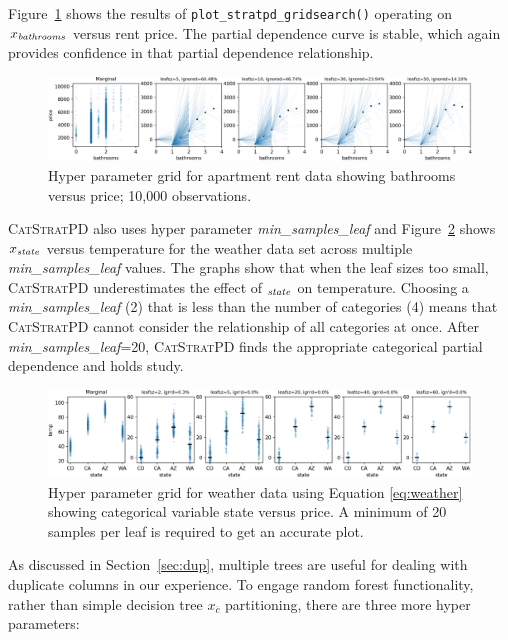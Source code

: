 \documentclass[12pt]{article}
\newcommand{\secref}[1]{Section~\ref{#1}}
\newcommand{\figref}[1]{Figure~\ref{#1}}
\newcommand{\cspd}{\fontfamily{cmr}\textsc{\small CatStratPD}}
\newcommand{\xnc}{$x_{\overline{c}}$}
\begin{document}
\figref{fig:bath_grid} shows the results of {\tt plot\_stratpd\_gridsearch()} operating on $x_{\it bathrooms}$ versus rent price. The partial dependence curve is stable, which again provides confidence in that partial dependence relationship.

\begin{figure}[htbp]
\begin{center}
\includegraphics[scale=0.5]{images/bathrooms_meta.png}
\caption{Hyper parameter grid for apartment rent data showing bathrooms versus price; 10,000 observations.}
\label{fig:bath_grid}
\end{center}
\end{figure}

\cspd{} also uses hyper parameter {\it min\_samples\_leaf} and \figref{fig:weather_grid} shows $x_{\it state}$ versus temperature for the weather data set across multiple {\it min\_samples\_leaf} values.  The graphs show that when the leaf sizes too small, \cspd{} underestimates the effect of $_{\it state}$ on temperature. Choosing a {\it min\_samples\_leaf} (2) that is less than the number of categories (4) means that \cspd{} cannot consider the relationship of all categories at once. After {\it min\_samples\_leaf}=20, \cspd{} finds the appropriate categorical partial dependence and holds study.

\begin{figure}[htbp]
\begin{center}
\includegraphics[scale=0.55]{images/state_temp_meta.png}
\caption{Hyper parameter grid for weather data using Equation \eqref{eq:weather} showing categorical variable state versus price.  A minimum of 20 samples per leaf is required to get an accurate plot.}
\label{fig:weather_grid}
\end{center}
\end{figure}


As discussed in \secref{sec:dup}, multiple trees are useful for dealing with duplicate columns in our experience. To engage random forest functionality, rather than simple decision tree \xnc{} partitioning, there are three more hyper parameters:
\end{document}
